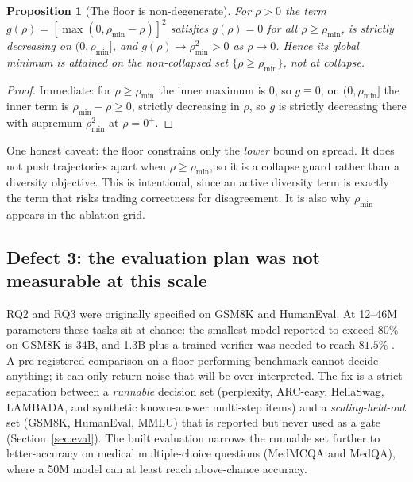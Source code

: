 \documentclass[11pt,a4paper]{article}
\newcommand{\rhodim}{\rho}
\theoremstyle{plain}
\newtheorem{proposition}{Proposition}
\theoremstyle{definition}
\theoremstyle{remark}
\begin{document}
\begin{proposition}[The floor is non-degenerate]
\label{prop:floor-nondegenerate}
For $\rhodim > 0$ the term $g(\rhodim) = [\max(0, \rhodim_{\min} - \rhodim)]^2$
satisfies $g(\rhodim) = 0$ for all $\rhodim \ge \rhodim_{\min}$, is strictly
decreasing on $(0, \rhodim_{\min}]$, and $g(\rhodim) \to \rhodim_{\min}^2 > 0$
as $\rhodim \to 0$. Hence its global minimum is attained on the
\emph{non-collapsed} set $\{\rhodim \ge \rhodim_{\min}\}$, not at collapse.
\end{proposition}
\begin{proof}
Immediate: for $\rhodim \ge \rhodim_{\min}$ the inner maximum is $0$, so
$g \equiv 0$; on $(0,\rhodim_{\min}]$ the inner term is
$\rhodim_{\min} - \rhodim \ge 0$, strictly decreasing in $\rhodim$, so $g$ is
strictly decreasing there with supremum $\rhodim_{\min}^2$ at $\rhodim = 0^+$.
\end{proof}

\noindent
One honest caveat: the floor constrains only the \emph{lower} bound on spread.
It does not push trajectories apart when $\rhodim \ge \rhodim_{\min}$, so it
is a collapse guard rather than a diversity objective. This is intentional,
since an active diversity term is exactly the term that risks trading
correctness for disagreement. It is also why $\rhodim_{\min}$ appears in the
ablation grid.

\subsection{Defect 3: the evaluation plan was not measurable at this scale}
\label{sec:defect3}

\noindent
RQ2 and RQ3 were originally specified on GSM8K and HumanEval. At 12--46M
parameters these tasks sit at chance: the smallest model reported to exceed
$80\%$ on GSM8K is 34B, and 1.3B plus a trained verifier was needed to reach
$81.5\%$ \cite{li2023tinygsm}. A pre-registered comparison on a
floor-performing benchmark cannot decide anything; it can only return noise
that will be over-interpreted. The fix is a strict separation between a
\emph{runnable} decision set (perplexity, ARC-easy, HellaSwag, LAMBADA, and
synthetic known-answer multi-step items) and a \emph{scaling-held-out} set
(GSM8K, HumanEval, MMLU) that is reported but never used as a gate
(Section~\ref{sec:eval}). The built evaluation narrows the runnable set
further to letter-accuracy on medical multiple-choice questions (MedMCQA and
MedQA), where a 50M model can at least reach above-chance accuracy.
\end{document}
